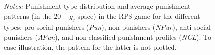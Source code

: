 \documentclass[11pt,a4paper]{article}
\begin{document}
\begin{refsection}
\begin{figure}[tbp]
  \label{fig:rpstype}
        \parbox{.95\textwidth}{\footnotesize \textit{Notes:} Punishment type
          distribution and average punishment patterns (in the $20 - g_j$-space)
          in the RPS-game
          for the different types: pro-social punishers (\emph{Pun}),
          non-punishers (\emph{NPun}), anti-social punishers (\emph{APun}), and
          non-classified punishment profiles (\textit{NCL}). To ease
          illustration, the pattern for the latter is not plotted.} 
\end{figure}


\end{refsection}
\end{document}
